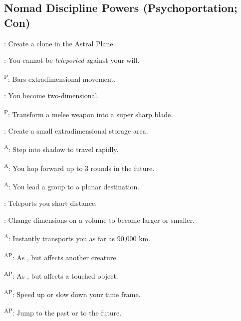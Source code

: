 \subsection{Nomad Discipline Powers {\normalsize(Psychoportation; Con)}}
\begin{enumerate*}
\item {}: Create a clone in the Astral Plane.

      : You cannot be \emph{teleported} against your will.

\item {}\textsuperscript{P}: Bars extradimensional movement.

      : You become two-dimensional.

\item {}\textsuperscript{P}: Transform a melee weapon into a super sharp blade.

      : Create a small extradimensional storage area.

      \textsuperscript{A}: Step into shadow to travel rapidly.

      \textsuperscript{A}: You hop forward up to 3 rounds in the future.

\item {}\textsuperscript{A}: You lead a group to a planar destination.

      : Teleports you short distance. %

      : Change dimensions on a volume to become larger or smaller.

\item {}\textsuperscript{A}: Instantly transports you as far as 90,000 km.

      \textsuperscript{AP}: As , but affects another creature.

      \textsuperscript{AP}: As , but affects a touched object.

      \textsuperscript{AP}: Speed up or slow down your time frame.

      \textsuperscript{AP}: Jump to the past or to the future.


\end{enumerate*}
